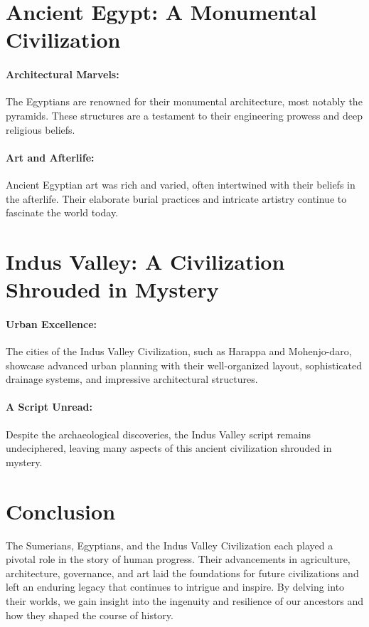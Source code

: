 \documentclass[a4paper,12pt]{book}
\begin{document}
\section*{Ancient Egypt: A Monumental Civilization}

\paragraph{Architectural Marvels:}
The Egyptians are renowned for their monumental architecture, most notably the pyramids. These structures are a testament to their engineering prowess and deep religious beliefs.

\paragraph{Art and Afterlife:}
Ancient Egyptian art was rich and varied, often intertwined with their beliefs in the afterlife. Their elaborate burial practices and intricate artistry continue to fascinate the world today.

\section*{Indus Valley: A Civilization Shrouded in Mystery}

\paragraph{Urban Excellence:}
The cities of the Indus Valley Civilization, such as Harappa and Mohenjo-daro, showcase advanced urban planning with their well-organized layout, sophisticated drainage systems, and impressive architectural structures.

\paragraph{A Script Unread:}
Despite the archaeological discoveries, the Indus Valley script remains undeciphered, leaving many aspects of this ancient civilization shrouded in mystery.

\section*{Conclusion}

The Sumerians, Egyptians, and the Indus Valley Civilization each played a pivotal role in the story of human progress. Their advancements in agriculture, architecture, governance, and art laid the foundations for future civilizations and left an enduring legacy that continues to intrigue and inspire. By delving into their worlds, we gain insight into the ingenuity and resilience of our ancestors and how they shaped the course of history.
\end{document}

